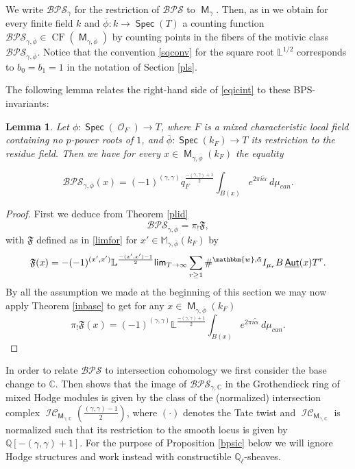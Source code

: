\documentclass{article}
\newcommand{\MF}{\mathfrak{F}}
\renewcommand{\lim}{\mathsf{lim}}
\DeclareMathOperator{\uAut}{\underline{\mathsf{Aut}}}
\DeclareMathOperator{\M}{{\mathsf{M}}}
\DeclareMathOperator{\Spec}{\mathsf{Spec}}
\DeclareMathOperator{\Oo}{\mathcal{O}}
\DeclareMathOperator{\CIC}{\mathcal{IC}}
\newcommand{\BC}{{\mathbb{C}}}
\newcommand{\BL}{{\mathbb{L}}}
\newcommand{\BM}{{\mathbb{M}}}
\newcommand{\BQ}{{\mathbb{Q}}}
\newcommand{\Bw}{\mathbbm{w}}
\DeclareMathOperator{\mcf}{CF}
\newcommand{\BPS}{\mathcal{BPS} }
\theoremstyle{definition}
\theoremstyle{plain}
\newtheorem{lemma}[definition]{Lemma}
\begin{document}
We write $\BPS_\gamma$ for the restriction of $\BPS$ to $\M_\gamma$. Then, as in \cite[Appendix]{MR2453601} we obtain for every finite field $k$ and $\overline{\phi}: k \to \Spec(T)$ a counting function $\BPS_{\gamma,\overline{\phi}}\in \mcf(\M_{\gamma,\overline{\phi}})$ by counting points in the fibers of the motivic class $\BPS_{\gamma,\overline{\phi}}$. Notice that the convention \eqref{sqconv} for the square root $\BL^{1/2}$ corresponds to $b_0 = b_1 = 1$ in the notation of Section \ref{pls}. 

The following lemma relates the right-hand side of \eqref{eqicint} to these BPS-invariants:

\begin{lemma}\label{intbps} Let $\phi: \Spec(\Oo_F) \to T$, where $F$ is a mixed characteristic local field containing no $p$-power roots of $1$, and $\overline{\phi}:\Spec(k_F) \to T$ its restriction to the residue field. Then we have for every $x \in \M_{\gamma,\overline{\phi}}(k_F)$ the equality

\begin{equation}\label{intid} \BPS_{\gamma,\overline{\phi}}(x) =  (-1)^{(\gamma,\gamma)}q_F^{\frac{-(\gamma,\gamma)+1}{2}} \int_{B(x)} e^{2\pi i\tilde{\alpha}} \ d\mu_{can}. \end{equation}
\end{lemma}
\begin{proof} First  we deduce from Theorem \ref{plid} 
\[\BPS_{\gamma,\overline{\phi}} = \pi_! \MF,\]
with $\MF$ defined as in \eqref{limfor} for $x' \in \BM_{\gamma,\overline{\phi}}(k_F)$ by
\[\MF(x) = -(-1)^{(x',x')}\BL^{\frac{-(x',x')-1}{2}}\lim_{T\to \infty}\sum_{r \geq 1} \#^{\Bw,\tilde\alpha} I_{\mu_r}B\uAut(x) T^r.\]
By all the assumption we made at the beginning of this section we may now apply Theorem \ref{inbase} to get for any $x \in \M_{\gamma,\overline{\phi}}(k_F)$ 
\[ \pi_!\MF(x) = (-1)^{(\gamma,\gamma)}\BL^{\frac{-(\gamma,\gamma)+1}{2}}\int_{B(x)} e^{2\pi i\tilde{\alpha}} \ d\mu_{can}.\]
\end{proof}


In order to relate $\BPS$ to intersection cohomology we first consider the base change to $\BC$. Then \cite[Theorem 5.6]{Me15} shows that the image of $\BPS_{\gamma,\BC}$ in the Grothendieck ring of mixed Hodge modules is given by the class of the (normalized) intersection complex $\CIC_{\M_{\gamma,\BC}}(\frac{(\gamma,\gamma)-1}{2})$, where $(\cdot)$ denotes the Tate twist and $\CIC_{\M_{\gamma,\BC}}$ is normalized such that its restriction to the smooth locus is given by $\BQ[-(\gamma,\gamma)+1]$. For the purpose of Proposition \ref{bpsic} below we will ignore Hodge structures and work instead with constructible $\BQ_\ell$-sheaves. 
\end{document}
